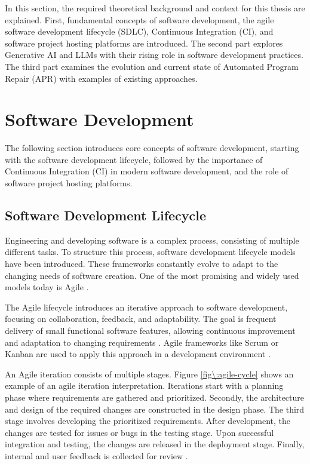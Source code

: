 In this section, the required theoretical background and context for this thesis are explained. First, fundamental concepts of software development, the agile software development lifecycle (SDLC), Continuous Integration (CI), and software project hosting platforms are introduced. The second part explores Generative AI and LLMs with their rising role in software development practices. The third part examines the evolution and current state of Automated Program Repair (APR) with examples of existing approaches.

\section{Software Development}

The following section introduces core concepts of software development, starting with the software development lifecycle, followed by the importance of Continuous Integration (CI) in modern software development, and the role of software project hosting platforms.

\subsection{Software Development Lifecycle}
Engineering and developing software is a complex process, consisting of multiple different tasks. To structure this process, software development lifecycle models have been introduced. These frameworks constantly evolve to adapt to the changing needs of software creation. One of the most promising and widely used models today is Agile \cite{rupareliaSoftwareDevelopmentLifecycle2010, abrahamssonAgileSoftwareDevelopment2017}.

The Agile lifecycle introduces an iterative approach to software development, focusing on collaboration, feedback, and adaptability. The goal is frequent delivery of small functional software features, allowing continuous improvement and adaptation to changing requirements \cite{rupareliaSoftwareDevelopmentLifecycle2010, abrahamssonAgileSoftwareDevelopment2017}. Agile frameworks like Scrum or Kanban are used to apply this approach in a development environment \cite{zayatFrameworkStudyAgile2020}.

An Agile iteration consists of multiple stages. Figure \ref{fig\:agile-cycle} shows an example of an agile iteration interpretation. Iterations start with a planning phase where requirements are gathered and prioritized. Secondly, the architecture and design of the required changes are constructed in the design phase. The third stage involves developing the prioritized requirements. After development, the changes are tested for issues or bugs in the testing stage. Upon successful integration and testing, the changes are released in the deployment stage. Finally, internal and user feedback is collected for review \cite{huoSoftwareQualityAgile2004}.


